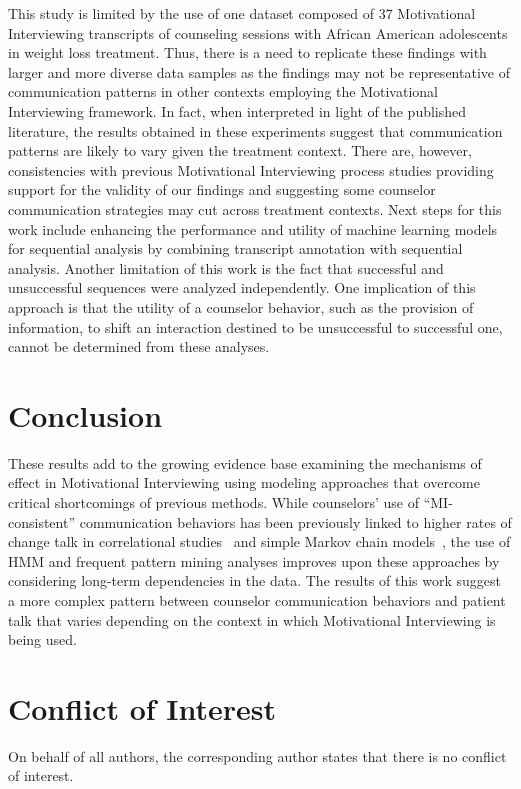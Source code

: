 This study is limited by the use of one dataset composed of 37 Motivational Interviewing transcripts of counseling sessions with African American adolescents in weight loss treatment. Thus, there is a need to replicate these findings with larger and more diverse data samples as the findings may not be representative of communication patterns in other contexts employing the Motivational Interviewing framework. In fact, when interpreted in light of the published literature, the results obtained in these experiments suggest that communication patterns are likely to vary given the treatment context. There are, however, consistencies with previous Motivational Interviewing process studies providing support for the validity of our findings and suggesting some counselor communication strategies may cut across treatment contexts. Next steps for this work include enhancing the performance and utility of machine learning models for sequential analysis by combining transcript annotation with sequential analysis. Another limitation of this work is the fact that successful and unsuccessful sequences were analyzed independently. One implication of this approach is that the utility of a counselor behavior, such as the provision of information, to shift an interaction destined to be unsuccessful to successful one, cannot be determined from these analyses.

\section{Conclusion}
\label{sec:conclusion}
These results add to the growing evidence base examining the mechanisms of effect in Motivational Interviewing using modeling approaches that overcome critical shortcomings of previous methods. While counselors' use of ``MI-consistent'' communication behaviors has been previously linked to higher rates of change talk in correlational studies~\cite{moyers2006therapist, catley2006adherence, thrasher2006motivational, mccambridge2011fidelity} and simple Markov chain models~\cite{moyers2006therapist, moyers2009session, gaume2010counselor}, the use of HMM and frequent pattern mining analyses improves upon these approaches by considering long-term dependencies in the data. The results of this work suggest a more complex pattern between counselor communication behaviors and patient talk that varies depending on the context in which Motivational Interviewing is being used.  

\section{Conflict of Interest}
\label{sec:conflictofInterest}
On behalf of all authors, the corresponding author states that there is no conflict of interest.

